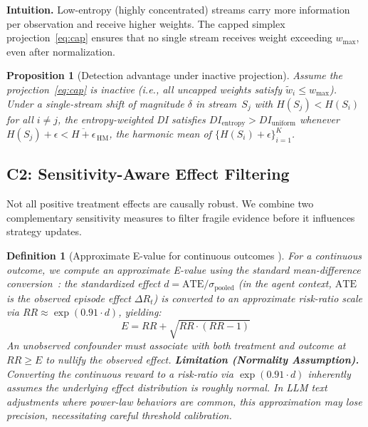 \documentclass{article}
\newtheorem{definition}{Definition}
\newtheorem{proposition}{Proposition}
\begin{document}
\textbf{Intuition.} Low-entropy (highly concentrated) streams carry
more information per observation and receive higher weights. The
capped simplex projection~\eqref{eq:cap} ensures that no single
stream receives weight exceeding $w_{\max}$, even after
normalization.

\begin{proposition}[Detection advantage under inactive projection]
\label{prop:detection}
Assume the projection~\eqref{eq:cap} is inactive (i.e., all
uncapped weights satisfy $\tilde{w}_i \leq w_{\max}$).
Under a single-stream shift of magnitude $\delta$ in stream~$S_j$
with $H(S_j) < H(S_i)$ for all $i \neq j$, the entropy-weighted DI
satisfies $DI_{\text{entropy}} > DI_{\text{uniform}}$ whenever
$H(S_j) + \epsilon < \overline{H+\epsilon}_{\,\text{HM}}$,
the harmonic mean of $\{H(S_i) + \epsilon\}_{i=1}^K$.
\end{proposition}


\subsection{C2: Sensitivity-Aware Effect Filtering}
\label{sec:sensitivity}

Not all positive treatment effects are causally robust. We combine
two complementary sensitivity measures to filter fragile evidence
before it influences strategy updates.

\begin{definition}[Approximate E-value for continuous outcomes
  \cite{vanderweele2017}]
\label{def:evalue}
For a continuous outcome, we compute an approximate E-value using the
standard mean-difference conversion~\cite{vanderweele2017}: the
standardized effect $d = \text{ATE} / \sigma_{\text{pooled}}$
(in the agent context, $\text{ATE}$ is the observed episode effect
$\Delta R_t$) is converted
to an approximate risk-ratio scale via
$RR \approx \exp(0.91 \cdot d)$, yielding:
\begin{equation}
  E = RR + \sqrt{RR \cdot (RR - 1)}
  \label{eq:evalue}
\end{equation}
An unobserved confounder must associate with both treatment and
outcome at $RR \geq E$ to nullify the observed effect. 
\textbf{Limitation (Normality Assumption).} Converting the continuous reward to a risk-ratio via $\exp(0.91 \cdot d)$ inherently assumes the underlying effect distribution is roughly normal. In LLM text adjustments where power-law behaviors are common, this approximation may lose precision, necessitating careful threshold calibration.
\end{definition}
\end{document}
